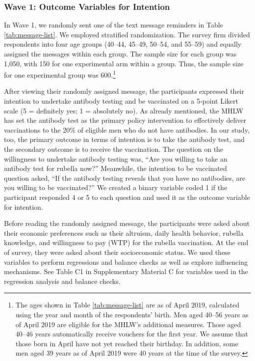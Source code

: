 \documentclass[
  11pt,
  a4paper
]{article}
\begin{document}
\hypertarget{wave1}{%
\subsubsection{Wave 1: Outcome Variables for Intention}\label{wave1}}

In Wave 1, we randomly sent one of the text message reminders in Table \ref{tab:message-list}. We employed stratified randomization. The survey firm divided respondents into four age groups (40--44, 45--49, 50--54, and 55--59) and equally assigned the messages within each group. The sample size for each group was 1,050, with 150 for one experimental arm within a group. Thus, the sample size for one experimental group was 600.\footnote{The ages shown in Table \ref{tab:message-list} are as of April 2019, calculated using the year and month of the respondents' birth. Men aged 40--56 years as of April 2019 are eligible for the MHLW's additional measures. Those aged 40--46 years automatically receive vouchers for the first year. We assume that those born in April have not yet reached their birthday. In addition, some men aged 39 years as of April 2019 were 40 years at the time of the survey.}

After viewing their randomly assigned message, the participants expressed their intention to undertake antibody testing and be vaccinated on a 5-point Likert scale (5 = definitely yes; 1 = absolutely no). As already mentioned, the MHLW has set the antibody test as the primary policy intervention to effectively deliver vaccinations to the 20\% of eligible men who do not have antibodies. In our study, too, the primary outcome in terms of intention is to take the antibody test, and the secondary outcome is to receive the vaccination. The question on the willingness to undertake antibody testing was, ``Are you willing to take an antibody test for rubella now?'' Meanwhile, the intention to be vaccinated question asked, ``If the antibody testing reveals that you have no antibodies, are you willing to be vaccinated?'' We created a binary variable coded 1 if the participant responded 4 or 5 to each question and used it as the outcome variable for intention.

Before reading the randomly assigned message, the participants were asked about their economic preferences such as their altruism, daily health behavior, rubella knowledge, and willingness to pay (WTP) for the rubella vaccination. At the end of survey, they were asked about their socioeconomic status. We used these variables to perform regressions and balance checks as well as explore influencing mechanisms. See Table C1 in Supplementary Material C for variables used in the regression analysis and balance checks.
\end{document}
